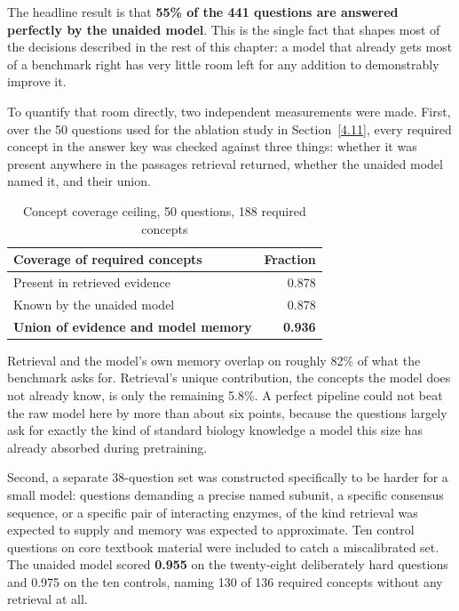 The headline result is that \textbf{55\% of the 441 questions are answered
perfectly by the unaided model}. This is the single fact that shapes most
of the decisions described in the rest of this chapter: a model that
already gets most of a benchmark right has very little room left for any
addition to demonstrably improve it.

To quantify that room directly, two independent measurements were made.
First, over the 50 questions used for the ablation study in
Section~\ref{4.11}, every required concept in the answer key was checked
against three things: whether it was present anywhere in the passages
retrieval returned, whether the unaided model named it, and their union.

\begin{table}[h]
\centering
\caption{Concept coverage ceiling, 50 questions, 188 required concepts}
\label{tab:4.2}
\begin{tabular}{@{}lr@{}}
\toprule
\textbf{Coverage of required concepts} & \textbf{Fraction} \\
\midrule
Present in retrieved evidence & 0.878 \\
Known by the unaided model & 0.878 \\
\textbf{Union of evidence and model memory} & \textbf{0.936} \\
\bottomrule
\end{tabular}
\end{table}

Retrieval and the model's own memory overlap on roughly 82\% of what the
benchmark asks for. Retrieval's unique contribution, the concepts the
model does not already know, is only the remaining 5.8\%. A perfect
pipeline could not beat the raw model here by more than about six points,
because the questions largely ask for exactly the kind of standard biology
knowledge a model this size has already absorbed during pretraining.

Second, a separate 38-question set was constructed specifically to be
harder for a small model: questions demanding a precise named subunit, a
specific consensus sequence, or a specific pair of interacting enzymes, of
the kind retrieval was expected to supply and memory was expected to
approximate. Ten control questions on core textbook material were included
to catch a miscalibrated set. The unaided model scored \textbf{0.955} on
the twenty-eight deliberately hard questions and 0.975 on the ten
controls, naming 130 of 136 required concepts without any retrieval at
all.

